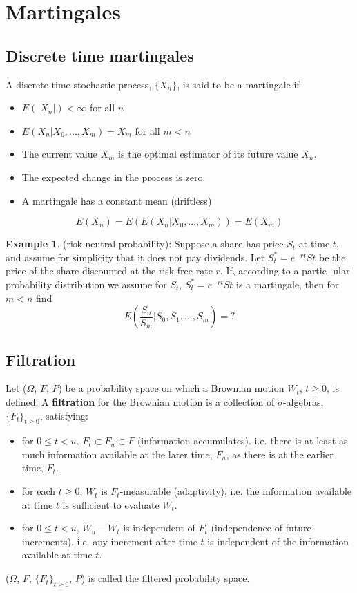 \documentclass[11pt,a4paper]{book}
\theoremstyle{definition}\newtheorem{definition}{Definition}
\theoremstyle{definition}\newtheorem{fact}{Fact}
\theoremstyle{definition}\newtheorem{remark}{Remark}
\theoremstyle{definition}\newtheorem{ex}{Ex.}
\theoremstyle{definition}\newtheorem{project}{Project}
\theoremstyle{definition}\newtheorem{problem}{Problem}
\theoremstyle{definition}\newtheorem{example}{Example}
\numberwithin{theorem}{section}
\numberwithin{corollary}{chapter}
\numberwithin{assumption}{chapter}
\numberwithin{definition}{chapter}
\numberwithin{prop}{chapter}
\numberwithin{notation}{chapter}
\numberwithin{problem}{chapter}
\numberwithin{example}{chapter}
\numberwithin{fact}{chapter}
\numberwithin{ex}{chapter}
\begin{document}
\section{Martingales}

\subsection{Discrete time martingales}
A discrete time stochastic process, $\{X_n\}$, is said to be a martingale if
\begin{itemize}
\item $E(|X_n|) < \infty$ for all $n$
\item $E(X_n | X_0, ..., X_m) = X_m$ for all $m<n$
\end{itemize}

\begin{itemize}[label={$\Rightarrow$}]
\item The current value $X_m$ is the optimal estimator of its future value $X_n$. 
\item The expected change in the process is zero.
\item A martingale has a constant mean (driftless)
\end{itemize}
$$E(X_n) = E(E(X_n | X_0, ..., X_m)) = E(X_m) $$
\begin{example}
(risk-neutral probability): Suppose a share has price $S_t$ at time $t$, and assume for simplicity that it does not pay dividends. Let $S_t^* = e^{-rt} St$ be the price of the share discounted at the risk-free rate $r$. If, according to a partic-
ular probability distribution we assume for $S_t$, $S_t^* = e^{-rt} St$ is a martingale, then for $m<n$ find
$$ E\left( \frac{S_n}{S_m} | S_0, S_1, ..., S_m \right) = ? $$
\end{example}

\subsection{Filtration}
Let ($\Omega$, $F$, $P$) be a probability space on which a Brownian motion $W_t$, $t \geq 0$, is defined. A \textbf{filtration} for the Brownian motion is a collection of $\sigma$-algebras, $\{F_t\}_{t\geq0}$, satisfying:
\begin{itemize}
\item for $0 \leq t < u$, $F_t \subset F_u \subset F$ (information accumulates). i.e. there is at least as much information available at the later time, $F_u$, as there is at the earlier time, $F_t$.
\item for each $t \geq 0$, $W_t$ is $F_t$-measurable (adaptivity), i.e. the information available at time $t$ is sufficient to evaluate $W_t$.
\item for $0\leq t<u$, $W_u - W_t$ is independent of $F_t$ (independence of future increments). i.e. any increment after time $t$ is independent of the information available at time $t$.
\end{itemize}
($\Omega$, $F$, $\{F_t\}_{t\geq0}$, $P$) is called the filtered probability space.
\end{document}
